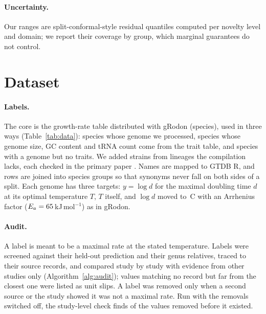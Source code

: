 \documentclass{article}
\begin{document}
\paragraph{Uncertainty.} Our ranges are split-conformal-style residual quantiles \citep{lei2018} computed per novelty
level and domain; we report their coverage by group, which marginal guarantees do not control.

\section{Dataset}\label{sec:data}
\paragraph{Labels.} The core is the growth-rate table distributed with gRodon (\NGrowthTable species), used in three ways
(Table~\ref{tab:data}): species whose genome we processed, species whose genome size, GC content and tRNA count come from
the trait table, and species with a genome but no traits. We added \NLiteratureWord strains from lineages the compilation
lacks, each checked in the primary paper \citep{konneke2005,stieglmeier2014,palatinszky2015,nowka2015,mohammadi2017,lehtovirtamorley2014}.
Names are mapped to GTDB R\GTDBRelease \citep{parks2022}, and rows are joined into species groups so that synonyms never fall
on both sides of a split. Each genome has three targets: $y=\log d$ for the maximal doubling time $d$ at its optimal
temperature $T$, $T$ itself, and $\log d$ moved to \TRefC\,\textdegree C with an Arrhenius factor
($E_a=65$\,kJ\,mol$^{-1}$) as in gRodon.

\paragraph{Audit.} A label is meant to be a maximal rate at the stated temperature. Labels were screened against their
held-out prediction and their genus relatives, traced to their source records, and compared study by study with evidence
from other studies only (Algorithm~\ref{alg:audit}); values matching no record but far from the closest one were listed as
unit slips. A label was removed only when a second source or the study showed it was not a maximal rate. Run with the
removals switched off, the study-level check finds \PosCtrlCaughtWord of the \PosCtrlNWord values removed before it existed.
\end{document}
